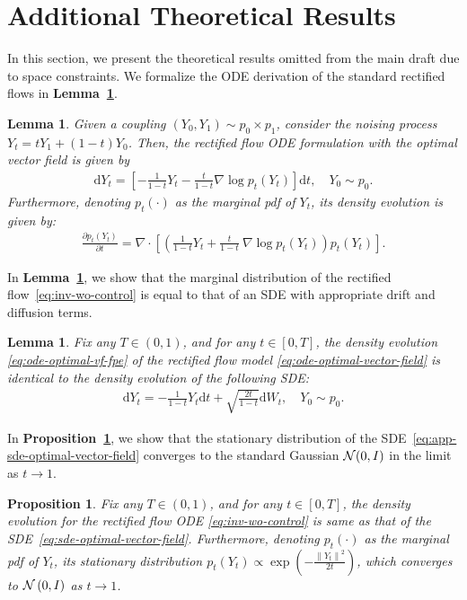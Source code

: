 \documentclass{article} %
\theoremstyle{plain}
\newtheorem{proposition}[theorem]{Proposition}
\newtheorem{lemma}[theorem]{Lemma}
\newcommand{\deriv}{\mathrm{d}}
\begin{document}
\section{Additional Theoretical Results}
\label{sec:addn-theory}
In this section, we present the theoretical results omitted from the main draft due to space constraints.
We formalize the ODE derivation of the standard rectified flows in \textbf{Lemma~\ref{lemma:optimal-vector-field}}.
\begin{lemma}
\label{lemma:optimal-vector-field}
Given a coupling $(Y_0, Y_1) \sim p_0 \times p_1$, consider the noising process $Y_t = tY_1 + (1-t)Y_0$.
Then, the rectified flow ODE formulation with the optimal vector field is given by 
\begin{align}
\label{eq:ode-optimal-vector-field}
    \deriv Y_t = \left[ -\frac{1}{1-t}Y_t - \frac{t}{1-t} \nabla \log p_t(Y_t) \right]\deriv t,\quad Y_0 \sim p_0.
\end{align}
Furthermore, denoting $p_t(\cdot)$ as the marginal pdf of $Y_t$, its density evolution is given by: 
\begin{align}
    \label{eq:ode-optimal-vf-fpe}
    \frac{\partial p_t(Y_t)}{\partial t}= \nabla \cdot \left[\left( \frac{1}{1-t}Y_t + \frac{t}{1-t}~\nabla \log p_t(Y_t) \right)p_t(Y_t)\right].
\end{align}
\end{lemma}
In \textbf{Lemma~\ref{lemma:sde2ode}}, we show that the marginal distribution of the rectified flow~\eqref{eq:inv-wo-control} is equal to that of an SDE with appropriate drift and diffusion terms.
\begin{lemma}
\label{lemma:sde2ode}
Fix any $T \in (0, 1)$, and for any $t \in [0, T]$, the density evolution \eqref{eq:ode-optimal-vf-fpe} of the rectified flow model \eqref{eq:ode-optimal-vector-field} is identical to the density evolution of the following SDE:
\begin{align}
    \label{eq:app-sde-optimal-vector-field}
    \deriv Y_t = -\frac{1}{1-t}Y_t \deriv t + \sqrt{\frac{2t}{1-t}} \deriv W_t, \quad Y_0\sim p_0.
\end{align}
\end{lemma}
In \textbf{Proposition~\ref{prop:rect-flow-ode-equals-sde}}, we show that the stationary distribution of the SDE~\eqref{eq:app-sde-optimal-vector-field} converges to the standard Gaussian ${\mathcal{N}}(0,I)$ in the limit as $t\rightarrow 1$.
\begin{proposition}
\label{prop:rect-flow-ode-equals-sde}
Fix any $T \in (0, 1)$, and for any $t \in [0, T]$, the density evolution for the rectified flow ODE \eqref{eq:inv-wo-control} is same as that of the SDE~\eqref{eq:sde-optimal-vector-field}.
Furthermore, denoting $p_t(\cdot)$ as the marginal pdf of $Y_t$, its stationary distribution $p_t(Y_t) \propto \exp{(-\frac{\left\|Y_t\right\|^2}{2t})}$, which converges to ${\mathcal{N}}\left(0,I\right)$ as $t\rightarrow1$.
\end{proposition}
\end{document}

